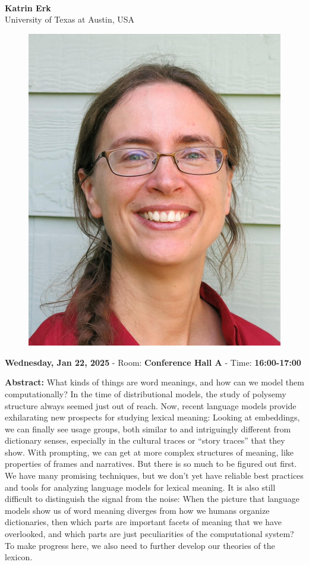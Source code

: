 {\centering
{}\\  \vspace*{-0.1cm} \leavevmode\newline
{\normalsize \textbf{Katrin Erk}}\\
{\normalsize {University of Texas at Austin, USA}}\\


\begin{figure}[h!]
  \centering
      \includegraphics[width=0.15\linewidth]{examples/handbook_coling25/invited_talks/katrin_erk_invited_2.png}
\end{figure}

 {\normalsize \textbf{Wednesday, Jan 22, 2025} -
 Room: \textbf{Conference Hall A} -
 Time: \textbf{16:00-17:00}\\\leavevmode\newline
 }
}

{\textbf{Abstract:}}
What kinds of things are word meanings, and how can we model them computationally? In the time of distributional models, the study of polysemy structure always seemed just out of reach. Now, recent language models provide exhilarating new prospects for studying lexical meaning: Looking at embeddings, we can finally see usage groups, both similar to and intriguingly different from dictionary senses, especially in the cultural traces or “story traces” that they show. With prompting, we can get at more complex structures of meaning, like properties of frames and narratives. But there is so much to be figured out first. We have many promising techniques, but we don’t yet have reliable best practices and tools for analyzing language models for lexical meaning. It is also still difficult to distinguish the signal from the noise: When the picture that language models show us of word meaning diverges from how we humans organize dictionaries, then which parts are important facets of meaning that we have overlooked, and which parts are just peculiarities of the computational system? To make progress here, we also need to further develop our theories of the lexicon.\\

